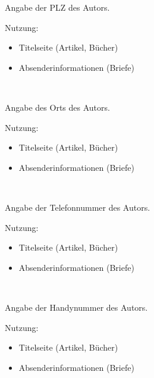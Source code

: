 \DescribeMacro{\plz}
Angabe der PLZ des Autors.

Nutzung:
\begin{itemize}
	\item Titelseite (Artikel, Bücher)
	\item Absenderinformationen (Briefe)
\end{itemize}

\begin{nutzung}
		\>\\
	\beispiel
		\>
\end{nutzung}

\DescribeMacro{\ort}
Angabe des Orts des Autors.

Nutzung:
\begin{itemize}
	\item Titelseite (Artikel, Bücher)
	\item Absenderinformationen (Briefe)
\end{itemize}

\begin{nutzung}
		\>\\
	\beispiel
		\>
\end{nutzung}

\DescribeMacro{\telefon}
Angabe der Telefonnummer des Autors.

Nutzung:
\begin{itemize}
	\item Titelseite (Artikel, Bücher)
	\item Absenderinformationen (Briefe)
\end{itemize}

\begin{nutzung}
		\>\\
	\beispiel
		\>
\end{nutzung}

\DescribeMacro{\handy}
Angabe der Handynummer des Autors.

Nutzung:
\begin{itemize}
	\item Titelseite (Artikel, Bücher)
	\item Absenderinformationen (Briefe)
\end{itemize}

\begin{nutzung}
		\>\\
	\beispiel
		\>
\end{nutzung}

